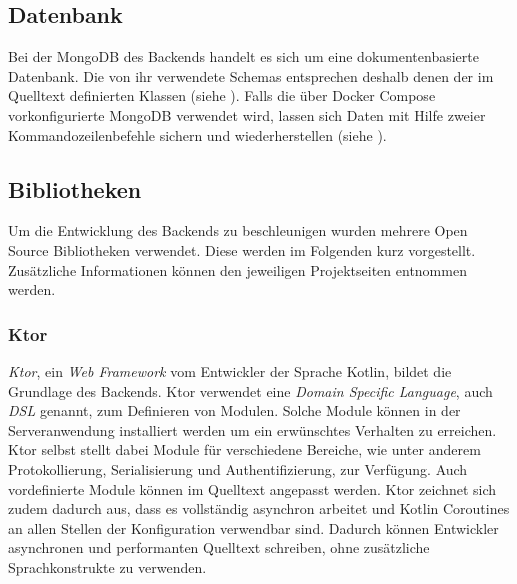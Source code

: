 \documentclass[a4paper, 11pt]{article}
\begin{document}
\subsection{Datenbank}
\label{subsec:backend:database}
Bei der MongoDB des Backends handelt es sich um eine dokumentenbasierte Datenbank.
Die von ihr verwendete Schemas entsprechen deshalb denen der im Quelltext definierten Klassen (siehe ).
Falls die über Docker Compose vorkonfigurierte MongoDB verwendet wird, lassen sich Daten mit Hilfe zweier Kommandozeilenbefehle sichern und wiederherstellen (siehe ).

\subsection{Bibliotheken}
\label{subsec:backend:bibs}
Um die Entwicklung des Backends zu beschleunigen wurden mehrere Open Source Bibliotheken verwendet.
Diese werden im Folgenden kurz vorgestellt.
Zusätzliche Informationen können den jeweiligen Projektseiten entnommen werden.

\subsubsection{Ktor}
\label{subsubsec:backend:bibs:ktor}
\textit{Ktor}, ein \textit{Web Framework} vom Entwickler der Sprache Kotlin, bildet die Grundlage des Backends.
Ktor verwendet eine \textit{Domain Specific Language}, auch \textit{DSL} genannt, zum Definieren von Modulen.
Solche Module können in der Serveranwendung installiert werden um ein erwünschtes Verhalten zu erreichen.
Ktor selbst stellt dabei Module für verschiedene Bereiche, wie unter anderem Protokollierung, Serialisierung und Authentifizierung, zur Verfügung.
Auch vordefinierte Module können im Quelltext angepasst werden.
Ktor zeichnet sich zudem dadurch aus, dass es vollständig asynchron arbeitet und Kotlin Coroutines an allen Stellen der Konfiguration verwendbar sind.
Dadurch können Entwickler asynchronen und performanten Quelltext schreiben, ohne zusätzliche Sprachkonstrukte zu verwenden.
\end{document}
